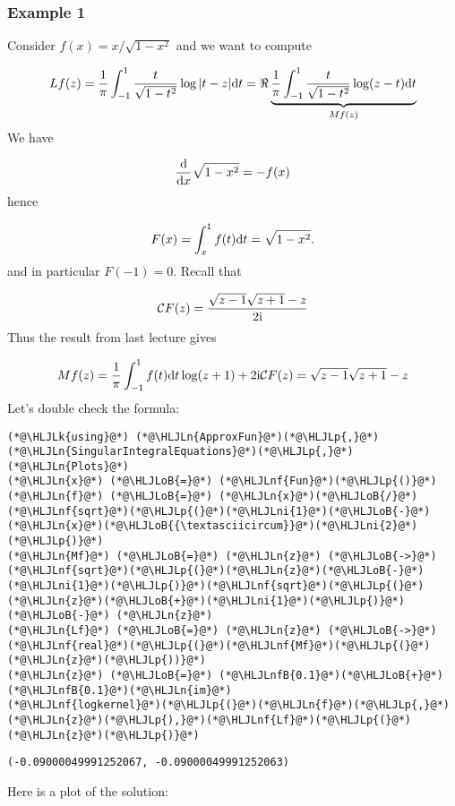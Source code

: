 \documentclass[12pt,a4paper]{article}
\newcommand{\HLJLk}[1]{\textcolor[RGB]{148,91,176}{\textbf{#1}}}
\newcommand{\HLJLn}[1]{#1}
\newcommand{\HLJLnf}[1]{\textcolor[RGB]{66,102,213}{#1}}
\newcommand{\HLJLnfB}[1]{\textcolor[RGB]{59,151,46}{#1}}
\newcommand{\HLJLni}[1]{\textcolor[RGB]{59,151,46}{#1}}
\newcommand{\HLJLoB}[1]{\textcolor[RGB]{102,102,102}{\textbf{#1}}}
\newcommand{\HLJLp}[1]{#1}
\def\D{ {\rm d} }
\def\I{ {\rm i} }
\def\CC{ {\cal C} }
\def\dx{\D x}
\begin{document}
\subsubsection{Example 1}
Consider $f(x) = x/\sqrt{1-x^2}$ and we want to compute

\[
L f(z) = {1 \over \pi} \int_{-1}^1 {t \over \sqrt{1-t^2}} \log|t-z| \D t = \Re \underbrace{{1 \over \pi} \int_{-1}^1 {t \over \sqrt{1-t^2}} \log(z-t) \D t }_{M f(z)}
\]
We have

\[
{\D \over \dx} \sqrt{1-x^2} = - f(x)
\]
hence

\[
F(x) = \int_x^1 f(t) \D t = \sqrt{1-x^2}.
\]
and in particular $F(-1) = 0$. Recall that

\[
\CC F(z) = {\sqrt{z-1} \sqrt{z+1} - z\over 2 \I}
\]
Thus the result from last lecture gives

\[
M f(z) = {1 \over \pi} \int_{-1}^1 f(t) \D t \log(z+1)+ 2 \I \CC F(z) = \sqrt{z-1} \sqrt{z+1} - z
\]
Let's double check the formula:


\begin{lstlisting}
(*@\HLJLk{using}@*) (*@\HLJLn{ApproxFun}@*)(*@\HLJLp{,}@*) (*@\HLJLn{SingularIntegralEquations}@*)(*@\HLJLp{,}@*) (*@\HLJLn{Plots}@*)
(*@\HLJLn{x}@*) (*@\HLJLoB{=}@*) (*@\HLJLnf{Fun}@*)(*@\HLJLp{()}@*)
(*@\HLJLn{f}@*) (*@\HLJLoB{=}@*) (*@\HLJLn{x}@*)(*@\HLJLoB{/}@*)(*@\HLJLnf{sqrt}@*)(*@\HLJLp{(}@*)(*@\HLJLni{1}@*)(*@\HLJLoB{-}@*)(*@\HLJLn{x}@*)(*@\HLJLoB{{\textasciicircum}}@*)(*@\HLJLni{2}@*)(*@\HLJLp{)}@*)
(*@\HLJLn{Mf}@*) (*@\HLJLoB{=}@*) (*@\HLJLn{z}@*) (*@\HLJLoB{->}@*) (*@\HLJLnf{sqrt}@*)(*@\HLJLp{(}@*)(*@\HLJLn{z}@*)(*@\HLJLoB{-}@*)(*@\HLJLni{1}@*)(*@\HLJLp{)}@*)(*@\HLJLnf{sqrt}@*)(*@\HLJLp{(}@*)(*@\HLJLn{z}@*)(*@\HLJLoB{+}@*)(*@\HLJLni{1}@*)(*@\HLJLp{)}@*) (*@\HLJLoB{-}@*) (*@\HLJLn{z}@*)
(*@\HLJLn{Lf}@*) (*@\HLJLoB{=}@*) (*@\HLJLn{z}@*) (*@\HLJLoB{->}@*) (*@\HLJLnf{real}@*)(*@\HLJLp{(}@*)(*@\HLJLnf{Mf}@*)(*@\HLJLp{(}@*)(*@\HLJLn{z}@*)(*@\HLJLp{))}@*)
(*@\HLJLn{z}@*) (*@\HLJLoB{=}@*) (*@\HLJLnfB{0.1}@*)(*@\HLJLoB{+}@*)(*@\HLJLnfB{0.1}@*)(*@\HLJLn{im}@*)
(*@\HLJLnf{logkernel}@*)(*@\HLJLp{(}@*)(*@\HLJLn{f}@*)(*@\HLJLp{,}@*)(*@\HLJLn{z}@*)(*@\HLJLp{),}@*)(*@\HLJLnf{Lf}@*)(*@\HLJLp{(}@*)(*@\HLJLn{z}@*)(*@\HLJLp{)}@*)
\end{lstlisting}

\begin{lstlisting}
(-0.09000049991252067, -0.09000049991252063)
\end{lstlisting}


Here is a plot of the solution:
\end{document}
